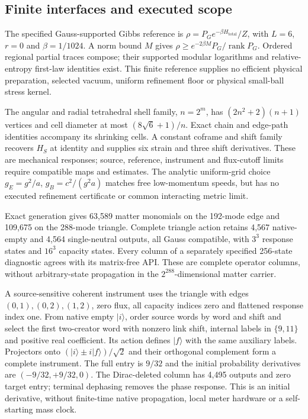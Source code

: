 \subsection{Finite interfaces and executed scope}
\label{sec:common-finite-interfaces}
\label{sec:common-execution-scope}

The specified Gauss-supported Gibbs reference is
$\rho=P_Ge^{-\beta H_{\mathrm{total}}}/Z$, with $L=6$, $r=0$ and
$\beta=1/1024$. A norm bound $M$ gives
$\rho\geq e^{-2\beta M}P_G/\operatorname{rank}P_G$.
Ordered regional partial traces compose; their supported modular logarithms
and relative-entropy first-law identities exist. This finite reference
supplies no efficient physical preparation, selected vacuum, uniform
refinement floor or physical small-ball stress kernel.

The angular and radial tetrahedral shell family, $n=2^m$, has
$(2n^2+2)(n+1)$ vertices and cell diameter at most $(8\sqrt6+1)/n$.
Exact chain and edge-path identities accompany its shrinking cells.
A constant coframe and shift family recovers $H_S$ at identity and supplies
six strain and three shift derivatives. These are mechanical responses;
source, reference, instrument and flux-cutoff limits require compatible
maps and estimates. The analytic uniform-grid choice
$g_E=g^2/a$, $g_B=c^2/(g^2a)$ matches free low-momentum speeds, but has
no executed refinement certificate or common interacting metric limit.

Exact generation gives 63,589 matter monomials on the 192-mode edge and
109,675 on the 288-mode triangle. Complete triangle action retains
4,567 native-empty and 4,564 single-neutral outputs, all Gauss compatible,
with $3^3$ response states and $16^3$ capacity states. Every column of a
separately specified 256-state diagnostic agrees with its matrix-free API.
These are complete operator columns, without arbitrary-state propagation
in the $2^{288}$-dimensional matter carrier.

A source-sensitive coherent instrument uses the triangle with edges
$(0,1),(0,2),(1,2)$, zero flux, all capacity indices zero and flattened
response index one. From native empty $|i\rangle$, order source words by
word and shift and select the first two-creator word with nonzero link
shift, internal labels in $\{9,11\}$ and positive real coefficient.
Its action defines $|f\rangle$ with the same auxiliary labels.
Projectors onto $(|i\rangle\pm i|f\rangle)/\sqrt2$ and their orthogonal
complement form a complete instrument. The full entry is $9/32$ and the
initial probability derivatives are $(-9/32,+9/32,0)$. The Dirac-deleted
column has 4,495 outputs and zero target entry; terminal dephasing removes
the phase response. This is an initial derivative, without finite-time
native propagation, local meter hardware or a self-starting mass clock.


